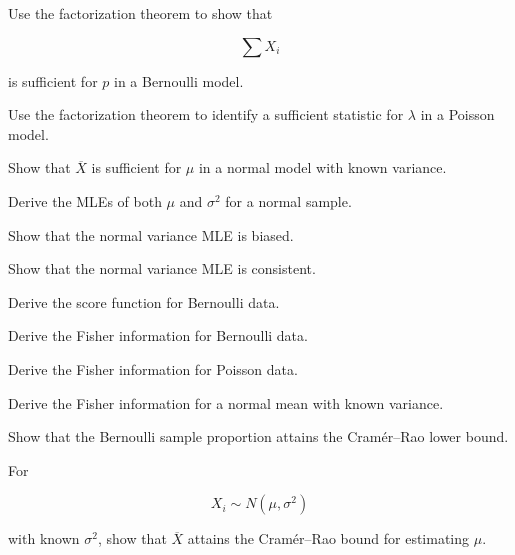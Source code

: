 \begin{exercise}[3]
Use the factorization theorem to show that

\[
\sum X_i
\]

is sufficient for \(p\) in a Bernoulli model.
\end{exercise}

\begin{exercise}[3]
Use the factorization theorem to identify a sufficient statistic for
\(\lambda\) in a Poisson model.
\end{exercise}

\begin{exercise}[3]
Show that \(\overline{X}\) is sufficient for \(\mu\) in a normal model
with known variance.
\end{exercise}

\begin{exercise}[3]
Derive the MLEs of both \(\mu\) and \(\sigma^2\) for a normal sample.
\end{exercise}

\begin{exercise}[3]
Show that the normal variance MLE is biased.
\end{exercise}

\begin{exercise}[3]
Show that the normal variance MLE is consistent.
\end{exercise}

\begin{exercise}[3]
Derive the score function for Bernoulli data.
\end{exercise}

\begin{exercise}[3]
Derive the Fisher information for Bernoulli data.
\end{exercise}

\begin{exercise}[3]
Derive the Fisher information for Poisson data.
\end{exercise}

\begin{exercise}[3]
Derive the Fisher information for a normal mean with known variance.
\end{exercise}

\begin{exercise}[3]
Show that the Bernoulli sample proportion attains the Cram\'er--Rao lower
bound.
\end{exercise}

\begin{exercise}[3]
For

\[
X_i\sim N(\mu,\sigma^2)
\]

with known \(\sigma^2\), show that \(\overline{X}\) attains the
Cram\'er--Rao bound for estimating \(\mu\).
\end{exercise}

